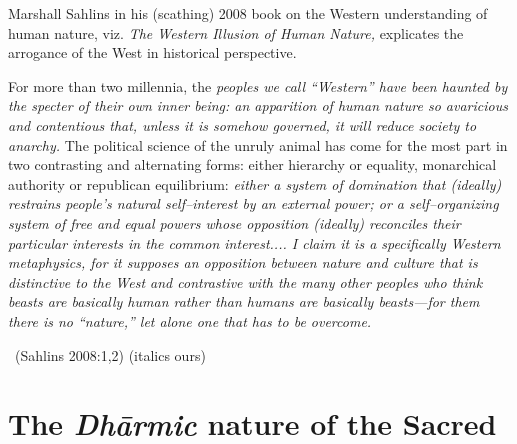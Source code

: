 Marshall Sahlins in his (scathing) 2008 book on the Western understanding of human nature, viz. \textit{The Western Illusion of Human Nature,} explicates the arrogance of the West in historical perspective.

\begin{myquote}
For more than two millennia, the \textit{peoples we call “Western” have been haunted by the specter of their own inner being: an apparition of human nature so avaricious and contentious that, unless it is somehow governed, it will reduce society to anarchy.} The political science of the unruly animal has come for the most part in two contrasting and alternating forms: either hierarchy or equality, monarchical authority or republican equilibrium: \textit{either a system of domination that (ideally) restrains people's natural self–interest by an external power; or a self–organizing system of free and equal powers whose opposition (ideally) reconciles their particular interests in the common interest.... I claim it is a specifically Western metaphysics, for it supposes an opposition between nature and culture that is distinctive to the West and contrastive with the many other peoples who think beasts are basically human rather than humans are basically beasts—for them there is no “nature,” let alone one that has to be overcome.} 

~\hfill (Sahlins 2008:1,2) (italics ours)
\end{myquote}


\section*{The \textit{Dhārmic} nature of the Sacred}

